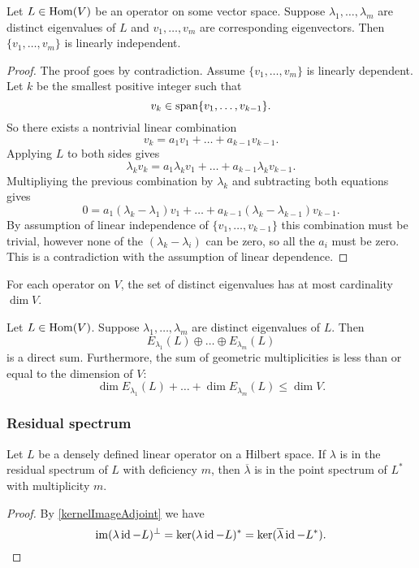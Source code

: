 \begin{proposition}
Let $L\in\operatorname{Hom}(V)$ be an operator on some vector space. Suppose $\lambda_1, \ldots, \lambda_m$ are distinct eigenvalues of $L$ and $v_1,\ldots, v_m$ are corresponding eigenvectors. Then $\{v_1,\ldots, v_m\}$ is linearly independent.
\end{proposition}
\begin{proof}
The proof goes by contradiction. Assume $\{v_1,\ldots, v_m\}$ is linearly dependent. Let $k$ be the smallest positive integer such that
\[ v_k \in \operatorname{span}\{v_1,\ldots, v_{k-1}\}. \]
So there exists a nontrivial linear combination
\[ v_k = a_1v_1+\ldots +a_{k-1}v_{k-1}. \]
Applying $L$ to both sides gives
\[ \lambda_kv_k = a_1\lambda_kv_1+\ldots +a_{k-1}\lambda_kv_{k-1}. \]
Multipliying the previous combination by $\lambda_k$ and subtracting both equations gives
\[ 0= a_1(\lambda_k-\lambda_1)v_1 +\ldots + a_{k-1}(\lambda_k - \lambda_{k-1})v_{k-1}. \]
By assumption of linear independence of $\{v_1,\ldots, v_{k-1}\}$ this combination must be trivial, however none of the $(\lambda_k-\lambda_i)$ can be zero, so all the $a_i$ must be zero. This is a contradiction with the assumption of linear dependence.
\end{proof}
\begin{corollary}
For each operator on $V$, the set of distinct eigenvalues has at most cardinality $\dim V$.
\end{corollary}
\begin{corollary}
Let $L\in\operatorname{Hom}(V)$. Suppose $\lambda_1, \ldots, \lambda_m$ are distinct eigenvalues of $L$. Then
\[ E_{\lambda_1}(L) \oplus \ldots \oplus E_{\lambda_m}(L) \]
is a direct sum. Furthermore, the sum of geometric multiplicities is less than or equal to the dimension of $V$:
\[ \dim E_{\lambda_1}(L) + \ldots + \dim E_{\lambda_m}(L) \leq \dim V. \]
\end{corollary}


\subsubsection{Residual spectrum}
\begin{proposition}
Let $L$ be a densely defined linear operator on a Hilbert space. If $\lambda$ is in the residual spectrum of $L$ with deficiency $m$, then $\overline{\lambda}$ is in the point spectrum of $L^*$ with multiplicity $m$.
\end{proposition}
\begin{proof}
By \ref{kernelImageAdjoint} we have
\[ \operatorname{im}(\lambda \operatorname{id} - L)^\perp = \ker(\lambda\operatorname{id} - L)^* = \ker(\overline{\lambda}\operatorname{id} - L^*). \]
\end{proof}

